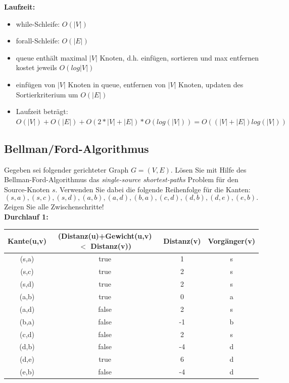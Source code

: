 \documentclass[paper=a4, fontsize=11pt]{scrartcl}
\numberwithin{equation}{section}
\numberwithin{figure}{section}
\numberwithin{table}{section}
\begin{document}
\textbf{Laufzeit:} 
\begin{itemize}
\item while-Schleife: $O(|V|)$
\item forall-Schleife: $O(|E|)$
\item queue enthält maximal $|V|$ Knoten, d.h. einfügen, sortieren und max entfernen kostet jeweils $O(log|V|)$
\item einfügen von $|V|$ Knoten in queue, entfernen von $|V|$ Knoten, updaten des Sortierkriterium um $O(|E|)$
\item Laufzeit beträgt: $O(|V|)+O(|E|)+O(2*|V|+|E|)*O(log(|V|)) = O((|V|+|E|)log(|V|))$
\end{itemize}

\subsection{Bellman/Ford-Algorithmus}
Gegeben sei folgender gerichteter Graph $G=(V,E)$. Lösen Sie mit Hilfe des Bellman-Ford-Algorithmus das \textit{single-source shortest-paths} Problem für den Source-Knoten $s$.
Verwenden Sie dabei die folgende Reihenfolge für die Kanten:
\[ (s,a), (s,c), (s,d), (a,b), (a,d), (b,a), (c,d), (d,b), (d,e), (e,b). \]
Zeigen Sie alle Zwischenschritte! \\

\textbf{Durchlauf 1:} \\

\begin{tabular}{|c||c|c|c|}
\hline
Kante(u,v) & (Distanz(u)+Gewicht(u,v) $<$ Distanz(v)) & Distanz(v) & Vorgänger(v) \\
\hline \hline
(s,a) & true & 1 & s \\\hline
(s,c) & true & 2 & s \\\hline
(s,d) & true & 2 & s \\\hline
(a,b) & true & 0 & a \\\hline
(a,d) & false & 2 & s \\\hline
(b,a) & false & -1 & b \\\hline
(c,d) & false & 2 & s \\\hline
(d,b) & false & -4 & d \\\hline
(d,e) & true & 6 & d \\\hline
(e,b) & false & -4 & d \\\hline
\end{tabular} \\
\end{document}

